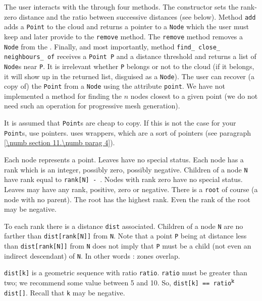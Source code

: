 The user interacts with the {\small\tt{}} through four methods.
The constructor sets the rank-zero distance and the ratio between successive
distances (see below).
Method {\small\tt add} adds a {\small\tt Point} to the cloud and returns a pointer to a
{\small\tt Node} which the user must keep and later provide to the {\small\tt remove} method.
The {\small\tt remove} method removes a {\small\tt Node} from the {\small\tt{}}.
Finally, and most importantly, method {\small\tt find\_\,close\_\,neighbours\_\,of} receives a
{\small\tt Point P} and a distance threshold and returns a list of {\small\tt Node}s near
{\small\tt P}.
It is irrelevant whether {\small\tt P} belongs or not to the cloud (if it belongs, it will
show up in the returned list, disguised as a {\small\tt Node}).
The user can recover (a copy of) the {\small\tt Point} from a {\small\tt Node} using the attribute
{\small\tt point}.
We have not implemented a method for finding the $n$ nodes closest to a given point
(we do not need such an operation for progressive mesh generation).

It is assumed that {\small\tt Point}s are cheap to copy.
If this is not the case for your {\small\tt Point}s, use pointers.
{\ManiFEM} uses wrappers, which are a sort of pointers (see paragraph
\ref{\numb section 11.\numb parag 4}).

Each node represents a point.
Leaves have no special status.
Each node has a rank which is an integer, possibly zero, possibly negative.
Children of a node {\small\tt N} have rank equal to {\small\tt rank[N] - }.
Nodes with rank zero have no special status.
Leaves may have any rank, positive, zero or negative.
There is a {\small\tt root} of course (a node with no parent).
The root has the highest rank.
Even the rank of the root may be negative.

To each rank there is a distance {\small\tt dist} associated.
Children of a node {\small\tt N} are no farther than {\small\tt dist[rank[N]]} from {\small\tt N}.
Note that a point {\small\tt P} being at distance less than {\small\tt dist[rank[N]]} from
{\small\tt N} does not imply that {\small\tt P} must be a child (not even an indirect descendant)
of {\small\tt N}.
In other words : zones overlap.

{\small\tt dist[k]} is a geometric sequence with ratio {\small\tt ratio}.
{\small\tt ratio} must be greater than two; we recommend some value between 5 and 10.
So, {\small\tt dist[k] == ratio}$^{\hbox{\footnotesize\tt k }}${\small\tt dist[]}.
Recall that {\small\tt k} may be negative.

